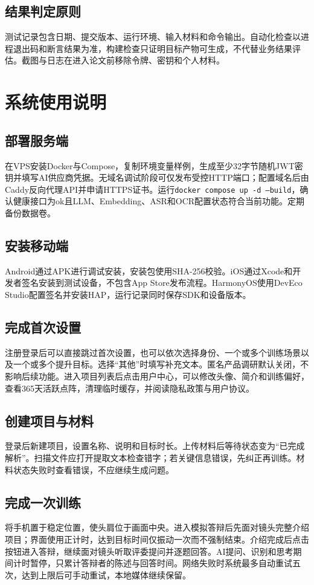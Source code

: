 \section{结果判定原则}
测试记录包含日期、提交版本、运行环境、输入材料和命令输出。自动化检查以进程退出码和断言结果为准，构建检查只证明目标产物可生成，不代替业务结果评估。截图与日志在进入论文前移除令牌、密钥和个人材料。

\chapter{系统使用说明}
\section{部署服务端}
在VPS安装Docker与Compose，复制环境变量样例，生成至少32字节随机JWT密钥并填写AI供应商凭据。无域名调试阶段可仅发布受控HTTP端口；配置域名后由Caddy反向代理API并申请HTTPS证书。运行\texttt{docker compose up -d --build}，确认健康接口为ok且LLM、Embedding、ASR和OCR配置状态符合当前功能。定期备份数据卷。

\section{安装移动端}
Android通过APK进行调试安装，安装包使用SHA-256校验。iOS通过Xcode和开发者签名安装到测试设备，不包含App Store发布流程。HarmonyOS使用DevEco Studio配置签名并安装HAP，运行记录同时保存SDK和设备版本。

\section{完成首次设置}
注册登录后可以直接跳过首次设置，也可以依次选择身份、一个或多个训练场景以及一个或多个提升目标。选择“其他”时填写补充文本。匿名产品调研默认关闭，不影响后续功能。进入项目列表后点击用户中心，可以修改头像、简介和训练偏好，查看365天活跃点阵，清理临时缓存，并阅读隐私政策与用户协议。

\section{创建项目与材料}
登录后新建项目，设置名称、说明和目标时长。上传材料后等待状态变为“已完成解析”。扫描文件应打开提取文本检查错字；若关键信息错误，先纠正再训练。材料状态失败时查看错误，不应继续生成问题。

\section{完成一次训练}
将手机置于稳定位置，使头肩位于画面中央。进入模拟答辩后先面对镜头完整介绍项目；界面使用正计时，达到目标时间仅振动一次而不强制结束。介绍完成后点击按钮进入答辩，继续面对镜头听取评委提问并逐题回答。AI提问、识别和思考期间计时暂停，只累计答辩者的陈述与回答时间。网络失败时系统最多自动重试五次，达到上限后可手动重试，本地媒体继续保留。

